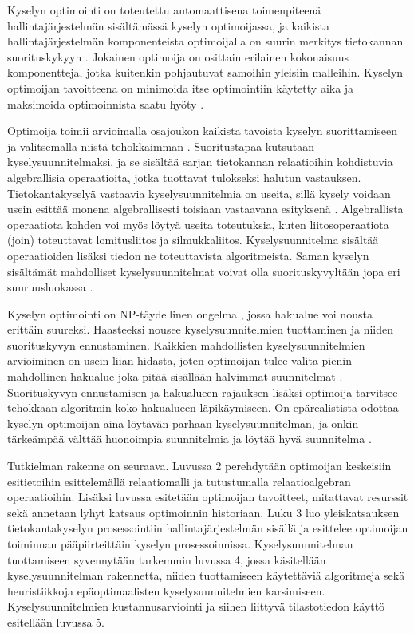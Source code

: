 \documentclass[finnish]{tktltiki2}
\theoremstyle{definition}
\theoremstyle{remark}
\begin{document}
Kyselyn optimointi on toteutettu automaattisena toimenpiteenä hallintajärjestelmän sisältämässä kyselyn optimoijassa, ja kaikista hallintajärjestelmän komponenteista optimoijalla on suurin merkitys tietokannan suorituskykyyn \cite{mor2012}. Jokainen optimoija on osittain erilainen kokonaisuus komponentteja, jotka kuitenkin pohjautuvat samoihin yleisiin malleihin. Kyselyn optimoijan tavoitteena on minimoida itse optimointiin käytetty aika ja maksimoida optimoinnista saatu hyöty \cite{jarke1984}. 

Optimoija toimii arvioimalla osajoukon kaikista tavoista kyselyn suorittamiseen ja valitsemalla niistä tehokkaimman \cite{selinger1979access}. Suoritustapaa kutsutaan kyselysuunnitelmaksi, ja se sisältää sarjan tietokannan relaatioihin kohdistuvia algebrallisia operaatioita, jotka tuottavat tulokseksi halutun vastauksen. Tietokantakyselyä vastaavia kyselysuunnitelmia on useita, sillä kysely voidaan usein esittää monena algebrallisesti toisiaan vastaavana esityksenä \cite{jarke1984}. Algebrallista operaatiota kohden voi myös löytyä useita toteutuksia, kuten liitosoperaatiota (join) toteuttavat lomitusliitos ja silmukkaliitos. Kyselysuunnitelma sisältää operaatioiden lisäksi tiedon ne toteuttavista algoritmeista. Saman kyselyn sisältämät mahdolliset kyselysuunnitelmat voivat olla suorituskyvyltään jopa eri suuruusluokassa \cite{ioannidis1996query, oracle2013refman}. 

Kyselyn optimointi on NP-täydellinen ongelma \cite{ibaraki1984optimal}, jossa hakualue voi nousta erittäin suureksi. Haasteeksi nousee kyselysuunnitelmien tuottaminen ja niiden suorituskyvyn ennustaminen. Kaikkien mahdollisten kyselysuunnitelmien arvioiminen on usein liian hidasta, joten optimoijan tulee valita pienin mahdollinen hakualue joka pitää sisällään halvimmat suunnitelmat \cite{chaudhuri1998}. Suorituskyvyn ennustamisen ja hakualueen rajauksen lisäksi optimoija tarvitsee tehokkaan algoritmin koko hakualueen läpikäymiseen. On epärealistista odottaa kyselyn optimoijan aina löytävän parhaan kyselysuunnitelman, ja onkin tärkeämpää välttää huonoimpia suunnitelmia ja löytää hyvä suunnitelma \cite{ramakrishnan2003database}. 

Tutkielman rakenne on seuraava. Luvussa 2 perehdytään optimoijan keskeisiin esitietoihin esittelemällä relaatiomalli ja tutustumalla relaatioalgebran operaatioihin. Lisäksi luvussa esitetään optimoijan tavoitteet, mitattavat resurssit sekä annetaan lyhyt katsaus optimoinnin historiaan. Luku 3 luo yleiskatsauksen tietokantakyselyn prosessointiin hallintajärjestelmän sisällä ja esittelee optimoijan toiminnan pääpiirteittäin kyselyn prosessoinnissa. Kyselysuunnitelman tuottamiseen syvennytään tarkemmin luvussa 4, jossa käsitellään kyselysuunnitelman rakennetta, niiden tuottamiseen käytettäviä algoritmeja sekä heuristiikkoja epäoptimaalisten kyselysuunnitelmien karsimiseen. Kyselysuunnitelmien kustannusarviointi ja siihen liittyvä tilastotiedon käyttö esitellään luvussa 5. 
\end{document}
